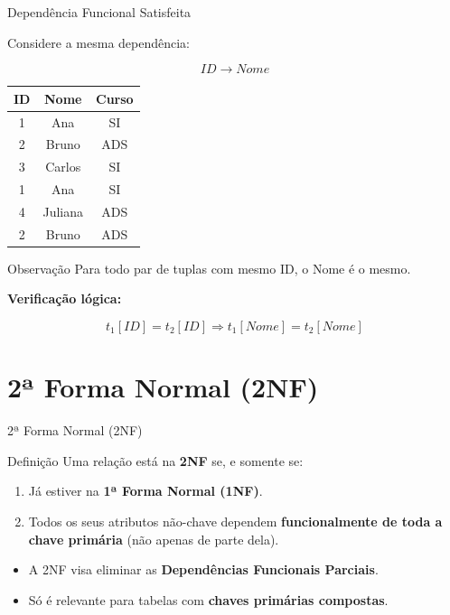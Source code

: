 \documentclass[9pt]{beamer}
\begin{document}
\begin{frame}{Dependência Funcional Satisfeita}

\small

Considere a mesma dependência:

\[
ID \rightarrow Nome
\]

\vspace{0.3cm}

\centering
\begin{tabular}{|c|c|c|}
\hline
ID & Nome & Curso \\ \hline
1 & Ana & SI \\ \hline
2 & Bruno & ADS \\ \hline
3 & Carlos & SI \\ \hline
1 & Ana & SI \\ \hline
4 & Juliana & ADS \\ \hline
2 & Bruno & ADS \\ \hline
\end{tabular}

\vspace{0.4cm}

\begin{block}{Observação}
Para todo par de tuplas com mesmo ID, o Nome é o mesmo.
\end{block}

\vspace{0.3cm}

\textbf{Verificação lógica:}

\[
t_1[ID] = t_2[ID] \Rightarrow t_1[Nome] = t_2[Nome]
\]

\end{frame}

\section{2ª Forma Normal (2NF)}

\begin{frame}{2ª Forma Normal (2NF)}
  \begin{block}{Definição}
    Uma relação está na \textbf{2NF} se, e somente se:
    \begin{enumerate}
      \item Já estiver na \textbf{1ª Forma Normal (1NF)}.
      \item Todos os seus atributos não-chave dependem \textbf{funcionalmente de toda a chave primária} (não apenas de parte dela).
    \end{enumerate}
  \end{block}
  \vspace{0.3cm}
  \begin{itemize}
    \item A 2NF visa eliminar as \textbf{Dependências Funcionais Parciais}.
    \item Só é relevante para tabelas com \textbf{chaves primárias compostas}.
  \end{itemize}
\end{frame}
\end{document}
